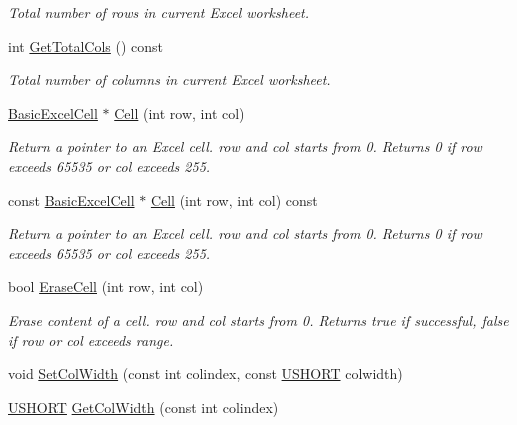 \begin{DoxyCompactItemize}
\begin{DoxyCompactList}\small\item\em Total number of rows in current Excel worksheet. \end{DoxyCompactList}\item 
int \hyperlink{class_y_excel_1_1_basic_excel_worksheet_a76ba86b19cb3325f8e0d15fd5be03d34}{Get\+Total\+Cols} () const 
\begin{DoxyCompactList}\small\item\em Total number of columns in current Excel worksheet. \end{DoxyCompactList}\item 
\hyperlink{class_y_excel_1_1_basic_excel_cell}{Basic\+Excel\+Cell} $\ast$ \hyperlink{class_y_excel_1_1_basic_excel_worksheet_a8fb39f8d5f883e4946af0f5457ae40df}{Cell} (int row, int col)
\begin{DoxyCompactList}\small\item\em Return a pointer to an Excel cell. row and col starts from 0. Returns 0 if row exceeds 65535 or col exceeds 255. \end{DoxyCompactList}\item 
const \hyperlink{class_y_excel_1_1_basic_excel_cell}{Basic\+Excel\+Cell} $\ast$ \hyperlink{class_y_excel_1_1_basic_excel_worksheet_ad89a01db18182eb40ecdef1ca4bd52fb}{Cell} (int row, int col) const 
\begin{DoxyCompactList}\small\item\em Return a pointer to an Excel cell. row and col starts from 0. Returns 0 if row exceeds 65535 or col exceeds 255. \end{DoxyCompactList}\item 
bool \hyperlink{class_y_excel_1_1_basic_excel_worksheet_a60a1ac663ba3bc3aa9668db035fa750c}{Erase\+Cell} (int row, int col)
\begin{DoxyCompactList}\small\item\em Erase content of a cell. row and col starts from 0. Returns true if successful, false if row or col exceeds range. \end{DoxyCompactList}\item 
void \hyperlink{class_y_excel_1_1_basic_excel_worksheet_aa6622d706fc57b443aa658ea06aee080}{Set\+Col\+Width} (const int colindex, const \hyperlink{_basic_excel_8hpp_a5850d5316caf7f4cedd742fdf8cd7c02}{U\+S\+H\+O\+R\+T} colwidth)
\item 
\hyperlink{_basic_excel_8hpp_a5850d5316caf7f4cedd742fdf8cd7c02}{U\+S\+H\+O\+R\+T} \hyperlink{class_y_excel_1_1_basic_excel_worksheet_a301a34eb141164d9d96046308b29e273}{Get\+Col\+Width} (const int colindex)

\end{DoxyCompactItemize}
